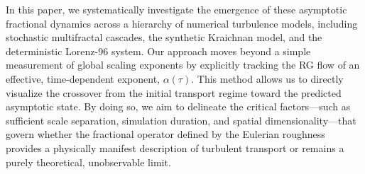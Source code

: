 \documentclass[]{article}
\begin{document}
In this paper, we systematically investigate the emergence of these asymptotic fractional dynamics across a hierarchy of numerical turbulence models, including stochastic multifractal cascades, the synthetic Kraichnan model, and the deterministic Lorenz-96 system. Our approach moves beyond a simple measurement of global scaling exponents by explicitly tracking the RG flow of an effective, time-dependent exponent, $\alpha(\tau)$. This method allows us to directly visualize the crossover from the initial transport regime toward the predicted asymptotic state. By doing so, we aim to delineate the critical factors—such as sufficient scale separation, simulation duration, and spatial dimensionality—that govern whether the fractional operator defined by the Eulerian roughness provides a physically manifest description of turbulent transport or remains a purely theoretical, unobservable limit.
\end{document}
